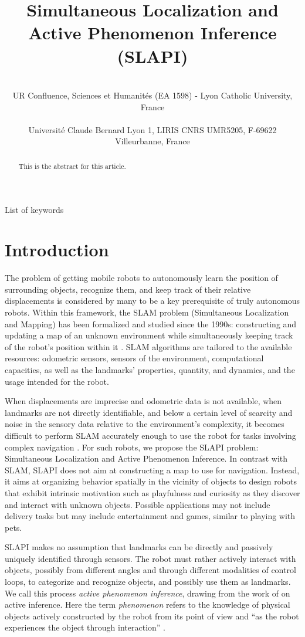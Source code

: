 \documentclass[pmlr]{jmlr}%
\title[SLAPI]{Simultaneous Localization and Active Phenomenon Inference (SLAPI)}
\author{\Name{Olivier L. Georgeon} \Email{ogeorgeon@univ-catholyon.fr}\\
  \addr UR Confluence, Sciences et Humanités (EA 1598) - Lyon Catholic University, France\\
   \Name{Titouan Knockaert} \Email{titouan.knockaert@gmail.com}\\
  \addr Université Claude Bernard Lyon 1, LIRIS CNRS UMR5205, F-69622 Villeurbanne, France
}
\begin{document}
\maketitle

\begin{abstract}
This is the abstract for this article.
\end{abstract}
\begin{keywords}
List of keywords
\end{keywords}

\section{Introduction}
\label{sec:intro}

The problem of getting mobile robots to autonomously learn the position of surrounding objects, recognize them, and keep track of their relative displacements is considered by many to be a key prerequisite of truly autonomous robots. 
Within this framework, the SLAM problem (Simultaneous Localization and Mapping) has been formalized and studied since the 1990s: constructing and updating a map of an unknown environment while simultaneously keeping track of the robot's position within it \citep[e.g.,][]{taketomi_visual_2017}.
SLAM algorithms are tailored to the available resources: odometric sensors, sensors of the environment, computational capacities, as well as the landmarks' properties, quantity, and dynamics, and the usage intended for the robot.

When displacements are imprecise and odometric data is not available, when landmarks are not directly identifiable, and below a certain level of scarcity and noise in the sensory data relative to the environment’s complexity, it becomes difficult to perform SLAM accurately enough to use the robot for tasks involving complex navigation \citep{gay_towards_2021}. 
For such robots, we propose the SLAPI problem:  Simultaneous Localization and Active Phenomenon Inference.
In contrast with SLAM, SLAPI does not aim at constructing a map to use for navigation. 
Instead, it aims at organizing behavior spatially in the vicinity of objects to design robots that exhibit intrinsic motivation \citep[e.g.,][]{oudeyer_intrinsic_2007} such as playfulness and curiosity as they discover and interact with unknown objects. 
Possible applications may not include delivery tasks but may include entertainment and games, similar to playing with pets. 

SLAPI makes no assumption that landmarks can be directly and passively uniquely identified through sensors. 
The robot must rather actively interact with objects, possibly from different angles and through different modalities of control loops, to categorize and recognize objects, and possibly use them as landmarks. 
We call this process \textit{active phenomenon inference}, drawing from the work of \cite{friston_world_2021} on active inference. 
Here the term \textit{phenomenon} refers to the knowledge of physical objects actively constructed by the robot from its point of view and ``as the robot experiences the object through interaction'' \citep{thorisson_explanation_2021}. 
\end{document}
